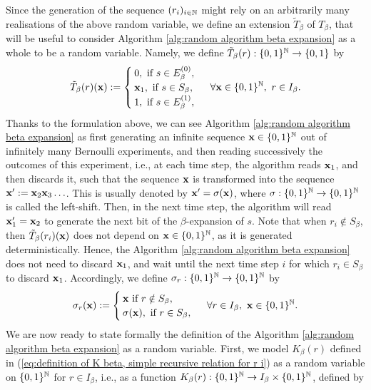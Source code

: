 Since the generation of the sequence $(r_i)_{i \in \mathbb{N}}$ might rely on an arbitrarily many realisations of the above random variable, we define an extension $\tilde T_\beta$ of $T_\beta$, that will be useful to consider Algorithm \ref{alg:random algorithm beta expansion} as a whole to be a random variable. Namely, we define $\tilde T_\beta(r) : \{0,1\}^{\mathbb{N}} \to \{0,1\}$ by 
\begin{equation}\label{eq:definition of the generalized random bit generator}
    \tilde T_\beta(r)({\bf x}) := \begin{cases}
        0, \ \text{if} \ s \in  E_\beta^{(0)},\\
        {\bf x}_1, \ \text{if} \ s \in  S_\beta,\\
        1, \ \text{if} \ s \in  E_\beta^{(1)},
    \end{cases}
    \ \forall {\bf x} \in \{0,1\}^{\mathbb{N}}, \ r \in I_\beta.
\end{equation}
Thanks to the formulation above, we can see Algorithm \ref{alg:random algorithm beta expansion} as first generating an infinite sequence ${\bf x} \in \{0,1\}^{\mathbb{N}}$ out of infinitely many Bernoulli experiments, and then reading successively the outcomes of this experiment, i.e., at each time step, the algorithm reads ${\bf x}_1$, and then discards it, such that the sequence ${\bf x}$ is transformed into the sequence ${\bf x}' := {\bf x}_2{\bf x}_3\ldots$. This is usually denoted by ${\bf x}' = \sigma({\bf x})$, where $\sigma : \{0,1\}^{\mathbb{N}} \to \{0,1\}^{\mathbb{N}}$ is called the left-shift. Then, in the next time step, the algorithm will read ${\bf x}'_1 = {\bf x}_2$ to generate the next bit of the $\beta$-expansion of $s$.  Note that when $r_i \notin S_\beta$, then $\tilde T_\beta(r_i)({\bf x})$ does not depend on ${\bf x} \in \{0,1\}^{\mathbb{N}}$, as it is generated deterministically. Hence, the Algorithm \ref{alg:random algorithm beta expansion} does not need to discard ${\bf x}_1$, and wait until the next time step $i$ for which $r_i \in S_\beta$ to discard ${\bf x}_1$. Accordingly, we define $\sigma_r : \{0,1\}^{\mathbb{N}} \to \{0,1\}^{\mathbb{N}}$ by 
\begin{equation}
    \sigma_r({\bf x}) := \begin{cases}
        {\bf x} \ \text{if} \ r \notin S_\beta,\\
        \sigma({\bf x}), \ \text{if} \ r \in S_\beta,
    \end{cases} \ \forall r \in I_\beta, \ {\bf x} \in \{0,1\}^{\mathbb{N}}.
\end{equation}
We are now ready to state formally the definition of the Algorithm \ref{alg:random algorithm beta expansion} as a random variable. First, we model $K_\beta(r)$ defined in (\ref{eq:definition of K beta, simple recursive relation for r i}) as a random variable on $\{0,1\}^{\mathbb{N}}$ for $r \in I_\beta$, i.e., as a function $K_\beta(r) : \{0,1\}^{\mathbb{N}} \to I_\beta \times \{0,1\}^{\mathbb{N}}$,  defined by 
